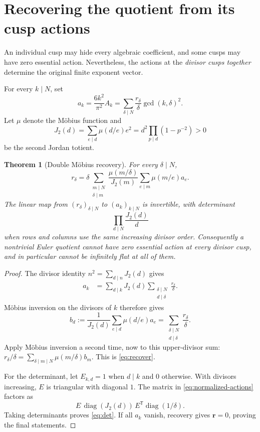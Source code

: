 \documentclass[11pt,a4paper]{article}
\numberwithin{equation}{section}
\newtheorem{theorem}{Theorem}[section]
\theoremstyle{definition}\newtheorem{definition}[theorem]{Definition}
\theoremstyle{remark}\newtheorem{remark}[theorem]{Remark}
\newcommand{\vct}[1]{\boldsymbol{#1}}
\begin{document}
\section{Recovering the quotient from its cusp actions}
\label{sec:recovery}
An individual cusp may hide every algebraic coefficient, and some cusps
may have zero essential action. Nevertheless, the actions at the
\emph{divisor cusps together} determine the original finite exponent
vector.

For every $k\mid N$, set
\begin{equation}\label{eq:normalized-actions}
 a_k=\frac{6k^2}{\pi^2}A_k
 =\sum_{\delta\mid N}\frac{r_\delta}{\delta}\gcd(k,\delta)^2.
\end{equation}
Let $\mu$ denote the M\"obius function and
\[
 J_2(d)=\sum_{e\mid d}\mu(d/e)e^2
       =d^2\prod_{p\mid d}(1-p^{-2})>0
\]
be the second Jordan totient.

\begin{theorem}[Double M\"obius recovery]\label{thm:recover}
For every $\delta\mid N$,
\begin{equation}\label{eq:recover}
 \boxed{\quad
 r_\delta=\delta
 \sum_{\substack{m\mid N\\\delta\mid m}}
 \frac{\mu(m/\delta)}{J_2(m)}
       \sum_{e\mid m}\mu(m/e)a_e.\quad}
\end{equation}
The linear map from $(r_\delta)_{\delta\mid N}$ to $(a_k)_{k\mid N}$
is invertible, with determinant
\begin{equation}\label{eq:det}
 \prod_{d\mid N}\frac{J_2(d)}{d}
\end{equation}
when rows and columns use the same increasing divisor order.
Consequently a nontrivial Euler quotient cannot have zero essential
action at every divisor cusp, and in particular cannot be infinitely
flat at all of them.
\end{theorem}
\begin{proof}
The divisor identity $n^2=\sum_{d\mid n}J_2(d)$ gives
\begin{align*}
 a_k
 &=\sum_{d\mid k}J_2(d)
       \sum_{\substack{\delta\mid N\\d\mid\delta}}
                   \frac{r_\delta}{\delta}.
\end{align*}
M\"obius inversion on the divisors of $k$ therefore gives
\[
 b_d:=\frac1{J_2(d)}\sum_{e\mid d}\mu(d/e)a_e
     =\sum_{\substack{\delta\mid N\\d\mid\delta}}
                     \frac{r_\delta}{\delta}.
\]
Apply M\"obius inversion a second time, now to this upper-divisor sum:
$r_\delta/\delta=\sum_{\delta\mid m\mid N}\mu(m/\delta)b_m$.
This is \eqref{eq:recover}.

For the determinant, let $E_{k,d}=1$ when $d\mid k$ and $0$ otherwise.
With divisors increasing, $E$ is triangular with diagonal $1$. The
matrix in \eqref{eq:normalized-actions} factors as
\[
 E\,\operatorname{diag}(J_2(d))\,E^{\mathsf T}
          \operatorname{diag}(1/\delta).
\]
Taking determinants proves \eqref{eq:det}. If all $a_k$ vanish, recovery
gives $\vct r=0$, proving the final statements.
\end{proof}
\end{document}
